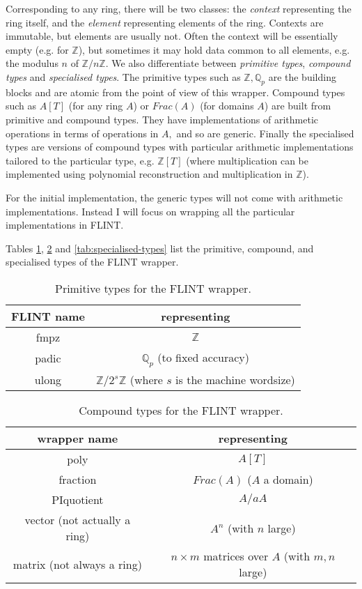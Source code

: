 \documentclass{scrartcl}
\begin{document}
Corresponding to any ring, there will be two classes: the \emph{context}
representing the ring itself, and the \emph{element} representing elements
of the ring. Contexts are immutable, but elements are usually not. Often
the context will be essentially empty (e.g. for $\mathbb{Z}$), but
sometimes it may hold data common to all elements, e.g. the modulus $n$ of
$\mathbb{Z}/n\mathbb{Z}.$ We also differentiate between \emph{primitive
types}, \emph{compound types} and \emph{specialised types}. The primitive
types such as $\mathbb{Z}, \mathbb{Q}_p$
are the building blocks and are atomic from the point of view of this
wrapper. Compound types such as $A[T]$ (for any ring $A$) or $Frac(A)$ (for
domains $A$) are built from primitive and compound types. They have
implementations of arithmetic operations in terms of operations in $A,$ and
so are generic. Finally the specialised types are versions of compound
types with particular arithmetic implementations tailored to the particular
type, e.g. $\mathbb{Z}[T]$ (where multiplication can be implemented using
polynomial reconstruction and multiplication in $\mathbb{Z}$).

For the initial implementation, the generic types will not come with
arithmetic implementations. Instead I will focus on wrapping all the
particular implementations in FLINT.

Tables \ref{tab:primitive-types}, \ref{tab:compound-types} and
\ref{tab:specialised-types} list the primitive, compound, and specialised
types of the FLINT wrapper.

\begin{table}[h]
\begin{center}
\begin{tabular}{cc}
FLINT name & representing \\
\hline
fmpz & $\mathbb{Z}$ \\
padic & $\mathbb{Q}_p$ (to fixed accuracy) \\
ulong & $\mathbb{Z}/2^{s}\mathbb{Z}$ (where $s$ is the machine wordsize) \\
\end{tabular}
\end{center}
\caption{Primitive types for the FLINT wrapper.}
\label{tab:primitive-types}
\end{table}

\begin{table}[h]
\begin{center}
\begin{tabular}{cc}
wrapper name & representing \\
\hline
poly & $A[T]$ \\
fraction & $Frac(A)$ ($A$ a domain) \\
PIquotient & $A/aA$ \\
vector (not actually a ring) & $A^n$ (with $n$ large) \\
matrix (not always a ring) & $n \times m$ matrices over $A$ (with $m, n$ large) \\
\end{tabular}
\end{center}
\caption{Compound types for the FLINT wrapper.}
\label{tab:compound-types}
\end{table}
\end{document}
